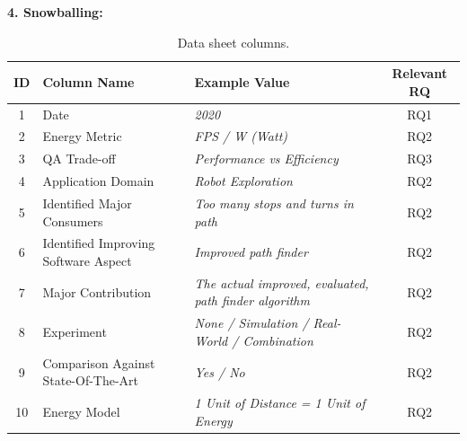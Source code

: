 \noindent\textbf{4. Snowballing:}
\begin{table}[t]
    \centering
    \caption{Data sheet columns.}
    \begin{tabular}{cllc}
        \toprule
            ID &
            Column Name & 
            Example Value & 
            Relevant RQ  \\
        \midrule
            1 &
               Date & 
                \textit{2020} & 
                RQ1 \\

            2 &
                Energy Metric & 
                \textit{FPS / W (Watt)} & 
                RQ2 \\

            3 &
                QA Trade-off & 
                \textit{Performance vs Efficiency} & 
                RQ3 \\
                
            4 &
                Application Domain & 
                \textit{Robot Exploration} & 
                RQ2 \\

            5 & 
                Identified Major Consumers & 
                \textit{Too many stops and turns in path} & 
                RQ2 \\

            6 & 
                Identified Improving Software Aspect & 
                \textit{Improved path finder} & 
                RQ2 \\
            
            7 &
                Major Contribution & 
                \textit{The actual improved, evaluated, path finder algorithm} & 
                RQ2 \\
            
            8 &
                Experiment & 
                \textit{None / Simulation / Real-World / Combination} & 
                RQ2 \\
            
            9 &
                Comparison Against State-Of-The-Art & 
                \textit{Yes / No} & 
                RQ2 \\
            
            10 &
                Energy Model &
                \textit{1 Unit of Distance = 1 Unit of Energy} & 
                RQ2 \\
        \bottomrule
    \end{tabular}
    \label{table:data_sheet}
\end{table}
